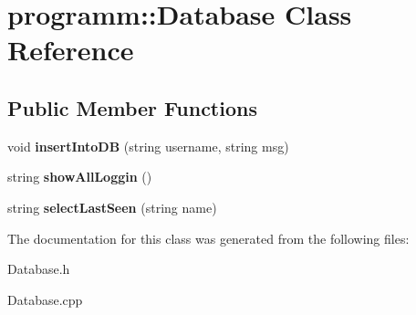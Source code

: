 \hypertarget{classprogramm_1_1Database}{\section{programm\-:\-:\-Database \-Class \-Reference}
\label{classprogramm_1_1Database}
}
\subsection*{\-Public \-Member \-Functions}
\begin{DoxyCompactItemize}
\item 
\hypertarget{classprogramm_1_1Database_a1693abd90563751ccc4aaec500712167}{void {\bfseries insert\-Into\-D\-B} (string username, string msg)}\label{classprogramm_1_1Database_a1693abd90563751ccc4aaec500712167}

\item 
\hypertarget{classprogramm_1_1Database_a9f692ce0aa91067cbc2c1f2a8b904cf9}{string {\bfseries show\-All\-Loggin} ()}\label{classprogramm_1_1Database_a9f692ce0aa91067cbc2c1f2a8b904cf9}

\item 
\hypertarget{classprogramm_1_1Database_ab580223062d179e831055764a9f0269b}{string {\bfseries select\-Last\-Seen} (string name)}\label{classprogramm_1_1Database_ab580223062d179e831055764a9f0269b}

\end{DoxyCompactItemize}


\-The documentation for this class was generated from the following files\-:\begin{DoxyCompactItemize}
\item 
\-Database.\-h\item 
\-Database.\-cpp\end{DoxyCompactItemize}
